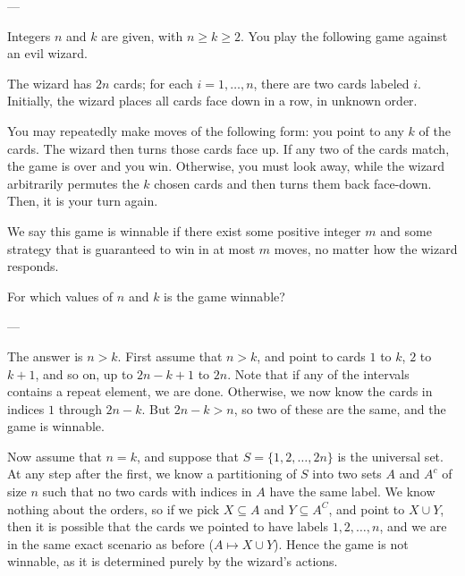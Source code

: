 
---

Integers $n$ and $k$ are given, with $n\ge k\ge2$. You play the following game against an evil wizard.

The wizard has $2n$ cards; for each $i=1,\ldots,n$, there are two cards labeled $i$. Initially, the wizard places all cards face down in a row, in unknown order.

You may repeatedly make moves of the following form: you point to any $k$ of the cards. The wizard then turns those cards face up. If any two of the cards match, the game is over and you win. Otherwise, you must look away, while the wizard arbitrarily permutes the $k$ chosen cards and then turns them back face-down. Then, it is your turn again.

We say this game is winnable if there exist some positive integer $m$ and some strategy that is guaranteed to win in at most $m$ moves, no matter how the wizard responds.

For which values of $n$ and $k$ is the game winnable?

---

The answer is $n>k$. First assume that $n>k$, and point to cards $1$ to $k$, $2$ to $k+1$, and so on, up to $2n-k+1$ to $2n$. Note that if any of the intervals contains a repeat element, we are done. Otherwise, we now know the cards in indices $1$ through $2n-k$. But $2n-k>n$, so two of these are the same, and the game is winnable.

Now assume that $n=k$, and suppose that $S=\{1,2,\ldots,2n\}$ is the universal set. At any step after the first, we know a partitioning of $S$ into two sets $A$ and $A^c$ of size $n$ such that no two cards with indices in $A$ have the same label. We know nothing about the orders, so if we pick $X\subseteq A$ and $Y\subseteq A^C$, and point to $X\cup Y$, then it is possible that the cards we pointed to have labels $1,2,\ldots,n$, and we are in the same exact scenario as before ($A\mapsto X\cup Y$). Hence the game is not winnable, as it is determined purely by the wizard's actions.
